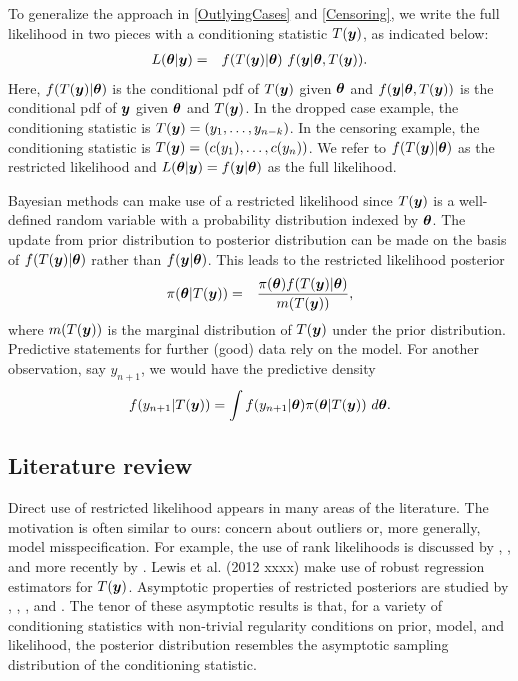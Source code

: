 \documentclass[12pt]{article}
\def\bth{\mbox{\boldmath $\theta$}}
\newcommand{\by}{\mbox{\boldmath $y$}}
\newcommand{\green}[1]{{\color{green}#1}}
\begin{document}
To generalize the approach in \eqref{OutlyingCases} and
\eqref{Censoring}, %
we write the full likelihood in two pieces with a conditioning statistic $T(\by)$, as indicated below:
\begin{eqnarray}
\label{FullLikelihood}
L(\bth | \by)  
& = & f(T(\by) | \bth) \,\, f(\by |\bth, T(\by)) .  
\end{eqnarray}
Here,  $f(T(\by) | \bth)$ is the conditional pdf of $T(\by)$ given $\bth$ and $f(\by |\bth, T(\by))$ is the conditional pdf of $\by$ given $\bth$ and $T(\by)$.  In the dropped case example, the conditioning statistic is $T(\by) = (y_1, \ldots, y_{n-k})$.  In 
the censoring example, the conditioning statistic is $T(\by) = (c(y_1),\ldots,c(y_n))$.  We refer to 
$f(T(\by) | \bth)$ as the restricted likelihood and $L(\bth | \by)=f(\by|\bth)$ as the full likelihood.  

Bayesian methods can make use of a restricted likelihood %
since $T(\by)$ is a well-defined random variable with a probability distribution indexed by $\bth$.  
The update from prior distribution to posterior distribution can be 
made on the basis of $f(T(\by)|\bth)$ rather than $f(\by|\bth)$.  This leads to the restricted likelihood posterior 
\begin{eqnarray}
\label{RestrictedPosterior}
\pi(\bth | T(\by)) & = & \frac{\pi(\bth) f(T(\by) | \bth)}{m(T(\by))} ,
\end{eqnarray}
where $m(T(\by))$ is the marginal distribution of $T(\by)$ under the prior distribution.  
Predictive statements for further (good) data rely on the model.  For another observation,
say $y_{n+1}$, we would have the predictive density 
\begin{eqnarray}
\label{RestrictedpredDist}
f(y_{n+1} | T(\by)) = \int f(y_{n+1} | \bth) \pi(\bth | T(\by))\ d\bth .  
\end{eqnarray}

\subsection{Literature review}
Direct use of restricted likelihood appears in many areas of the literature.  The motivation is often similar to ours:   
concern about outliers or, more generally, model misspecification.  For example, the use of rank likelihoods is discussed by \cite{savage1969}, \cite{pettitt1983, pettitt1982}, and more recently by \cite{hoff2013}.  
\green{Lewis et al. (2012 xxxx) make use of robust regression estimators for $T(\by)$.}  
Asymptotic properties of restricted posteriors are studied by \cite{doksum1990}, \cite{clarke1995}, \cite{yuan2004},  and \cite{hwang2005}. The tenor of these asymptotic 
results is that, for a variety of conditioning statistics with non-trivial regularity conditions on prior, model, and likelihood, the
posterior distribution resembles the asymptotic sampling distribution of the conditioning statistic.  
\end{document}
